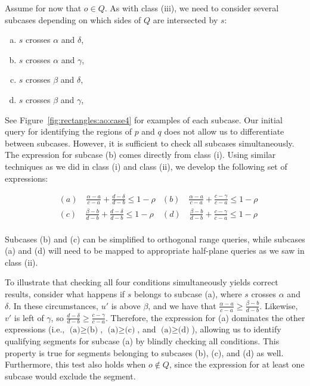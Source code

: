 Assume for now that $o \in Q$. As with class (iii), we need to consider several subcases depending on which sides of $Q$ are intersected by $s$:

\begin{enumerate}[(a)]
\item $s$ crosses $\alpha$ and $\delta$,
\item $s$ crosses $\alpha$ and $\gamma$,
\item $s$ crosses $\beta$ and $\delta$,
\item $s$ crosses $\beta$ and $\gamma$,
\end{enumerate}

See Figure~\ref{fig:rectangles:ao:case4} for examples of each subcase. Our initial query for identifying the regions of $p$ and $q$ does not allow us to differentiate between subcases. However, it is sufficient to check all subcases simultaneously. The expression for subcase (b) comes directly from class (i).  Using similar techniques as we did in class (i) and class (ii), we develop the following set of expressions:

\begin{align*}
& (a) \quad \frac{\alpha - a}{c - a} + \frac{d - \delta}{d - b} \leq 1 - \rho
& (b) \quad \frac{\alpha - a}{c - a} + \frac{c - \gamma}{c - a} \leq 1 - \rho \\
& (c) \quad \frac{\beta  - b}{d - b} + \frac{d - \delta}{d - b} \leq 1 - \rho  
& (d) \quad \frac{\beta  - b}{d - b} + \frac{c - \gamma}{c - a} \leq 1 - \rho \\
\end{align*}

Subcases (b) and (c) can be simplified to orthogonal range queries, while subcases (a) and (d) will need to be mapped to appropriate half-plane queries as we saw in class (ii).

To illustrate that checking all four conditions simultaneously yields correct results, consider what happens if $s$ belongs to subcase (a), where $s$ crosses $\alpha$ and $\delta$. In these circumstances, $u'$ is above $\beta$, and we have that $\frac{\alpha - a}{c - a} \geq \frac{\beta - b}{d - b}$.  Likewise, $v'$ is left of $\gamma$, so $\frac{d - \delta}{d - b} \geq \frac{c - \gamma}{c - a}$.  Therefore, the expression for (a) dominates the other expressions (i.e., $\text{(a)} \geq \text{(b)}$, $\text{(a)} \geq \text{(c)}$, and $\text{(a)} \geq \text{(d)}$), allowing us to identify qualifying segments for subcase (a) by blindly checking all conditions. This property is true for segments belonging to subcases (b), (c), and (d) as well. Furthermore, this test also holds when $o \not \in Q$, since the expression for at least one subcase would exclude the segment.


